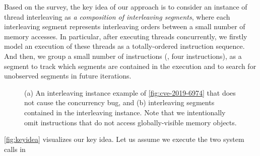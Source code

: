 %
Based on the survey, the key idea of our approach is to consider an
instance of thread interleaving as \textit{a composition of
  interleaving segments}, where each interleaving segment represents
interleaving orders between a small number of memory accesses.
%
In particular, after executing threads concurrently, we firstly model
an execution of these threads as a totally-ordered instruction
sequence.
%
And then, we group a small number of instructions (\eg, four
instructions), as a segment to track which segments are contained in
the execution and to search for unobserved segments in future
iterations.

\begin{figure}[t]
  \hfill
  \caption{(a) An interleaving instance example of
    \autoref{fig:cve-2019-6974} that does not cause the concurrency
    bug, and (b) interleaving segments contained in the interleaving
    instance. Note that we intentionally omit instructions that do not
    access globally-visible memory objects.}
  \label{fig:keyidea}
\end{figure}
%
\autoref{fig:keyidea} visualizes our key idea.
%
Let us assume we execute the two system calls in
